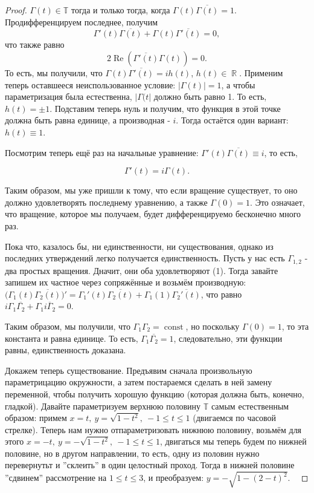 \documentclass[a4paper,100pt]{article}
\theoremstyle{indented}
\theoremstyle{definition}
\theoremstyle{remark}
\DeclareMathOperator{\Real}{Re}
\DeclareMathOperator{\RR}{\mathbb{R}}
\DeclareMathOperator{\const}{const}
\begin{document}
\begin{proof}
    $\Gamma(t)\in\mathbb{T}$ тогда и только тогда, когда $\Gamma(t)\overline{\Gamma(t)}=1$. Продифференцируем последнее, получим
    \[
        \Gamma'(t)\overline{\Gamma(t)}+\Gamma(t)\overline{\Gamma'(t)}=0, 
    \]
    что также равно 
    \[
        2\Real(\overline{\Gamma'(t)}\Gamma(t))=0.
    \]
    То есть, мы получили, что $\Gamma(t)\overline{\Gamma'(t)}=ih(t)$, $h(t)\in\RR$. Применим теперь оставшееся неиспользованное условие: $|\Gamma(t)|=1$, а чтобы параметризация была естественна, $|\Gamma(t|$ должно быть равно 1. То есть, $h(t)=\pm1$. Подставим теперь нуль и получим, что функция в этой точке должна быть равна единице, а производная - $i$. Тогда остаётся один вариант: $ h(t)\equiv 1$. \ 

    Посмотрим теперь ещё раз на начальные уравнение: $\Gamma'(t)\overline{\Gamma(t)}\equiv i$, то есть, 
    
    \begin{equation}
        \Gamma'(t)=i\Gamma(t).
    \end{equation}
    
    Таким образом, мы уже пришли к тому, что если вращение существует, то оно должно удовлетворять последнему уравнению, а также $\Gamma(0)=1$. Это означает, что вращение, которое мы получаем, будет дифференцируемо бесконечно много раз. \ 

    Пока что, казалось бы, ни единственности, ни существования, однако из последних утверждений легко получается единственность. Пусть у нас есть $\Gamma_{1,2}$ - два простых вращения. Дначит, они оба удовлетворяют (1). Тогда завайте запишем их частное через сопряжённые и возьмём производную: $ \biggl(\Gamma_1(t)\overline{\Gamma_2(t)}\biggr)'=\Gamma_1'(t)\overline{\Gamma_2(t)}+\Gamma_1(1)\overline{\Gamma_2'(t)}$, что равно $i\Gamma_1\overline{\Gamma_2}+\Gamma_1\overline{i\Gamma_2}=0$. \ 

    Таким образом, мы получили, что $\Gamma_1\Gamma_2=\const$, но поскольку $\Gamma(0)=1$, то эта константа и равна единице. То есть, $\Gamma_1\overline{\Gamma_2}=1$, следовательно, эти функции равны, единственность доказана. \ 

    Докажем теперь существование. Предъявим сначала произвольную параметрицацию окружности, а затем постараемся сделать в ней замену переменной, чтобы получить хорошую функцию (которая должна быть, конечно, гладкой). Давайте параметризуем верхнюю половину $\mathbb{T}$ самым естественным образом: примем $x=t, \: y=\sqrt{1-t^2}, \ -1\leq t\leq 1$ (двигаемся по часовой стрелке). Теперь нам нужно отпараметризовать нижнюю половину, возьмём для этого $x=-t, \: y=-\sqrt{1-t^2}, \: -1\leq t\leq 1$, двигаться мы теперь будем по нижней половине, но в другом направлении, то есть, одну из половин нужно перевернутьт и ''склеить'' в один целостный проход. Тогда в нижней половине ''сдвинем'' рассмотрение на $1\leq t\leq 3$, и преобразуем: $y=-\sqrt{1-(2-t)^2}$. \ 


\end{proof}
\end{document}

